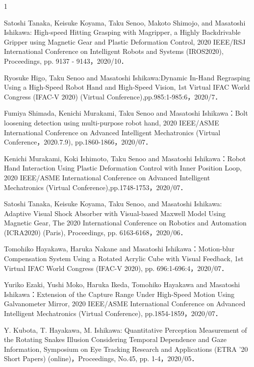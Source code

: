 \begin{査読付}{1}

Satoshi Tanaka, Keisuke Koyama, Taku Senoo, Makoto Shimojo, and Masatoshi Ishikawa: High-speed Hitting Grasping with Magripper, a Highly Backdrivable Gripper using Magnetic Gear and Plastic Deformation Control, 2020 IEEE/RSJ International Conference on Intelligent Robots and Systems (IROS2020), Proceedings, pp. 9137 - 9143，2020/10．

Ryosuke Higo, Taku Senoo and Masatoshi Ishikawa:Dynamic In-Hand Regrasping Using a High-Speed Robot Hand and High-Speed Vision, 1st Virtual IFAC World Congress (IFAC-V 2020) (Virtual Conference),pp.985:1-985:6，2020/7．

Fumiya Shimada, Kenichi Murakami, Taku Senoo and Masatoshi Ishikawa：Bolt loosening detection using multi-purpose robot hand, 2020 IEEE/ASME International Conference on Advanced Intelligent Mechatronics (Virtual Conference，2020.7.9), pp.1860-1866，2020/07．

Kenichi Murakami, Koki Ishimoto, Taku Senoo and Masatoshi Ishikawa：Robot Hand Interaction Using Plastic Deformation Control with Inner Position Loop, 2020 IEEE/ASME International Conference on Advanced Intelligent Mechatronics (Virtual Conference),pp.1748-1753，2020/07．

Satoshi Tanaka, Keisuke Koyama, Taku Senoo, and Masatoshi Ishikawa: Adaptive Visual Shock Absorber with Visual-based Maxwell Model Using Magnetic Gear, The 2020 International Conference on Robotics and Automation (ICRA2020) (Paris), Proceedings, pp. 6163-6168，2020/06．

Tomohiko Hayakawa, Haruka Nakane and Masatoshi Ishikawa：Motion-blur Compensation System Using a Rotated Acrylic Cube with Visual Feedback, 1st Virtual IFAC World Congress (IFAC-V 2020), pp. 696:1-696:4，2020/07．

Yuriko Ezaki, Yushi Moko, Haruka Ikeda, Tomohiko Hayakawa and Masatoshi Ishikawa：Extension of the Capture Range Under High-Speed Motion Using Galvanometer Mirror, 2020 IEEE/ASME International Conference on Advanced Intelligent Mechatronics (Virtual Conference), pp.1854-1859，2020/07．

Y. Kubota, T. Hayakawa, M. Ishikawa: Quantitative Perception Measurement of the Rotating Snakes Illusion Considering Temporal Dependence and Gaze Information, Symposium on Eye Tracking Research and Applications (ETRA '20 Short Papers) (online)，Proceedings, No.45, pp. 1-4，2020/05．


\end{査読付}
